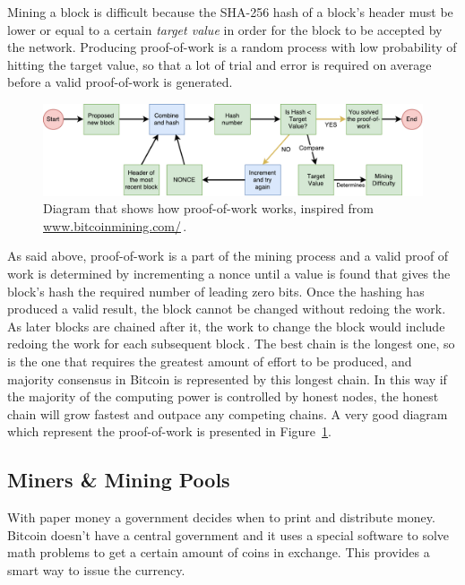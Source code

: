 \documentclass[USenglish]{uit-thesis}
\begin{document}
Mining a block is difficult because the SHA-256 hash of a block's header
must be lower or equal to a certain \emph{target value} in order for the
block to be accepted by the network.
Producing proof-of-work is a random process with low probability
of hitting the target value,
so that a lot of trial and error is required on average before a valid
proof-of-work is generated.

\begin{figure}[h]
	\centering
	\includegraphics[width=1\textwidth]{img/proof-of-work-schema}
	\caption{Diagram that shows how proof-of-work works, inspired from
		\url{www.bitcoinmining.com/}\,\cite{bitcoinmining}.}
	\label{fig:proof-of-work-schema}
\end{figure}

As said above, proof-of-work is a part of the mining process and a valid proof
of work is determined by incrementing a nonce until a value is found that gives the block's
hash the required number of leading zero bits. Once the hashing has produced a
valid result, the block cannot be changed without redoing the work. As later blocks are
chained after it, the work to change the block would include redoing the work for
each subsequent block\,\cite{bitcoinmining_process}.
The best chain is the longest one, so is the one that requires the greatest
amount of effort to be produced, and majority consensus in Bitcoin
is represented by this longest chain. In this way if the
majority of the computing power is controlled by honest nodes, the honest
chain will grow fastest and outpace any competing chains.
A very good diagram which represent the proof-of-work is presented
in Figure~\ref{fig:proof-of-work-schema}.

\subsection{Miners \& Mining Pools}
\label{sec:miner}
With paper money a government decides when
to print and distribute money. Bitcoin doesn't
have a central government and
it uses a special software to solve math problems
to get a certain amount of coins in exchange.
This provides a smart way to issue the currency.
\end{document}
